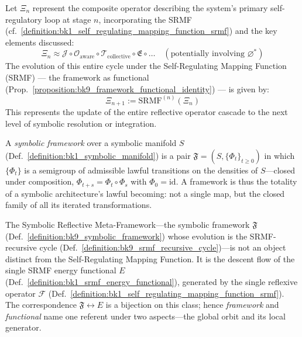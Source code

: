 \begin{definition}
\label{definition:bk9_srmf_recursive_cycle}
Let $\Xi_n$ represent the composite operator describing the system's primary self-regulatory loop at stage $n$, incorporating the SRMF (cf.~\ref{definition:bk1_self_regulating_mapping_function_srmf}) and the key elements discussed:
\[
\Xi_n \approx \mathcal{J} \circ \mathcal{O}_{\text{aware}} \circ \mathcal{T}_{\text{collective}} \circ \mathfrak{E} \circ \dots \quad (\text{potentially involving } \varnothing^*)
\]
The evolution of this entire cycle under the Self-Regulating Mapping Function (SRMF) --- the framework as functional (Prop.~\ref{proposition:bk9_framework_functional_identity}) --- is given by:
\[
\Xi_{n+1} := \mathrm{SRMF}^{(n)}(\Xi_n)
\]
This represents the update of the entire reflective operator cascade to the next level of symbolic resolution or integration.
\end{definition}
\begin{definition}
\label{definition:bk9_symbolic_framework}
A \emph{symbolic framework} over a symbolic manifold $S$ (Def.~\ref{definition:bk1_symbolic_manifold}) is a pair $\mathfrak{F} = (S, \{\Phi_t\}_{t\ge 0})$ in which $\{\Phi_t\}$ is a semigroup of admissible lawful transitions on the densities of $S$---closed under composition, $\Phi_{t+s} = \Phi_t \circ \Phi_s$ with $\Phi_0 = \mathrm{id}$. A framework is thus the totality of a symbolic architecture's lawful becoming: not a single map, but the closed family of all its iterated transformations.
\end{definition}
\begin{proposition}
\label{proposition:bk9_framework_functional_identity}
The Symbolic Reflective Meta-Framework---the symbolic framework $\mathfrak{F}$ (Def.~\ref{definition:bk9_symbolic_framework}) whose evolution is the SRMF-recursive cycle (Def.~\ref{definition:bk9_srmf_recursive_cycle})---is not an object distinct from the Self-Regulating Mapping Function. It is the descent flow of the single SRMF energy functional $E$ (Def.~\ref{definition:bk1_srmf_energy_functional}), generated by the single reflexive operator $\mathcal{F}$ (Def.~\ref{definition:bk1_self_regulating_mapping_function_srmf}). The correspondence $\mathfrak{F} \leftrightarrow E$ is a bijection on this class; hence \emph{framework} and \emph{functional} name one referent under two aspects---the global orbit and its local generator.
\end{proposition}
